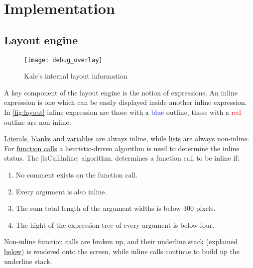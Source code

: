 \clearpage
\chapter{Implementation}

\section{Layout engine}

\begin{wrapfigure}[11]{r}{0.5\columnwidth}
\texttt{[image: debug\_overlay]}
\caption{Kale's internal layout information\protect\footnotemark}
\label{fig:layout}
\end{wrapfigure}
\medskip

A key component of the layout engine is the notion of  expressions.
An inline expression is one which can be easily displayed inside another inline
expression. In \autoref{fig:layout} inline expression are those with a
\textcolor{blue}{blue} outline, those with a \textcolor{red}{red} outline are
non-inline.

\hyperref[expr:literal]{Literals}, \hyperref[expr:blank]{blanks} and
\hyperref[expr:variable]{variables} are always inline, while
\hyperref[expr:list]{lists} are always non-inline.
For \hyperref[expr:function]{function calls} a heuristic-driven algorithm is
used to determine the inline status. The |isCallInline| algorithm, determines
a function call to be inline if:

\begin{enumerate}[noitemsep]
	\item No comment exists on the function call.
	\item Every argument is also inline.
	\item The sum total length of the argument widths is below 300 pixels.
	\item The hight of the expression tree of every argument is below four.
\end{enumerate}

Non-inline function calls are broken up, and their underline stack (explained
\hyperref[layout:underlines]{below}) is rendered onto the screen, while inline
calls continue to build up the underline stack.

